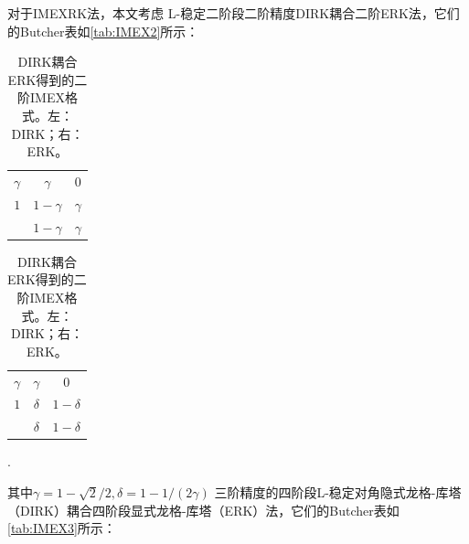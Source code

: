 对于IMEXRK法，本文考虑
L-稳定二阶段二阶精度DIRK耦合二阶ERK法\cite{ascher1997implicitexplicita}，它们的Butcher表如\autoref{tab:IMEX2}所示：
\begin{table}
    \centering
    \begin{minipage}{0.45\linewidth}
        \centering
        \begin{tabular}{c|cc}
            $\gamma$ & $\gamma$   & $0$      \\
            $1$      & $1-\gamma$ & $\gamma$ \\
                     & $1-\gamma$ & $\gamma$
        \end{tabular}
    \end{minipage}
    \begin{minipage}{0.45\linewidth}
        \centering
        \begin{tabular}{c|cc}
            $\gamma$ & $\gamma$ & $0$         \\
            $1$      & $\delta$ & $1- \delta$ \\
                     & $\delta$ & $1-\delta$
        \end{tabular}.
    \end{minipage}
    \caption{DIRK耦合ERK得到的二阶IMEX格式。左：DIRK；右：ERK。}
    \label{tab:IMEX:2}
\end{table}
其中$\gamma=1- \sqrt{2}/2,\delta = 1- 1/(2\gamma)$
三阶精度的四阶段L-稳定对角隐式龙格-库塔（DIRK）耦合四阶段显式龙格-库塔（ERK）法\cite{ascher1997implicitexplicita}，它们的Butcher表如\autoref{tab:IMEX3}所示：
